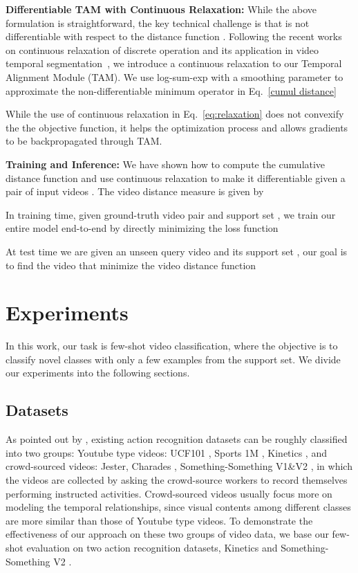 \documentclass[10pt,twocolumn,letterpaper]{article}
\begin{document}
\noindent
\textbf{Differentiable TAM with Continuous Relaxation:} While the above formulation is straightforward, the key technical challenge is that  is not differentiable with respect to the distance function . Following the recent works on continuous relaxation of discrete operation and its application in video temporal segmentation~\cite{chang2019d, mensch2018differentiable}, we introduce a continuous relaxation to our Temporal Alignment Module (TAM). We use log-sum-exp with a smoothing parameter  to approximate the non-differentiable minimum operator in Eq.~\eqref{cumul distance}

While the use of continuous relaxation in Eq.~\eqref{eq:relaxation} does not convexify the the objective function, it helps the optimization process and allows gradients to be backpropagated through TAM. 

\noindent
\textbf{Training and Inference:}
We have shown how to compute the cumulative distance function  and use continuous relaxation to make it differentiable given a pair of input videos . The video distance measure is given by

In training time, given ground-truth video pair  and support set , we train our entire model end-to-end by directly minimizing the loss function

At test time we are given an unseen query video  and its support set , our goal is to find the video  that minimize the video distance function





\section{Experiments}

In this work, our task is few-shot video classification, where the objective is to classify novel classes with only a few examples from the support set. We divide our experiments into the following sections. 

\subsection{Datasets}

As pointed out by \cite{xie2018rethinking,zhou2018temporal}, existing action recognition datasets can be roughly classified into two groups: Youtube type videos: UCF101 \cite{soomro2012ucf101}, Sports 1M \cite{karpathy2014large}, Kinetics \cite{kay2017kinetics}, and crowd-sourced videos: Jester\cite{jester}, Charades \cite{sigurdsson2016hollywood}, Something-Something V1\&V2 \cite{goyal2017something}, in which the videos are collected by asking the crowd-source workers to record themselves performing instructed activities. Crowd-sourced videos usually focus more on modeling the temporal relationships, since visual contents among different classes are more similar than those of Youtube type videos. To demonstrate the effectiveness of our approach on these two groups of video data, we base our few-shot evaluation on two action recognition datasets, Kinetics \cite{kay2017kinetics} and Something-Something V2 \cite{goyal2017something}. 
\end{document}
